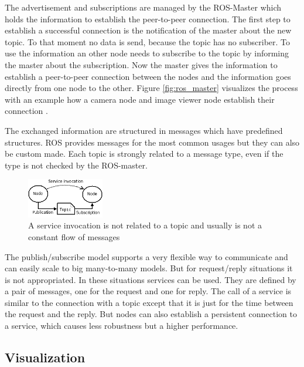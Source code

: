 The advertisement and subscriptions are managed by the ROS-Master which holds the information to establish the peer-to-peer connection.
The first step to establish a successful connection is the notification of the master about the new topic.
To that moment no data is send, because the topic has no subscriber.
To use the information an other node needs to subscribe to the topic by informing the master about the subscription.
Now the master gives the information to establish a peer-to-peer connection between the nodes and the information goes directly from one node to the other.
Figure \ref{fig:ros_master} visualizes the process with an example how a camera node and image viewer node establish their connection \cite{rosMaster}.

The exchanged information are structured in messages which have predefined structures.
ROS provides messages for the most common usages but they can also be custom made.
Each topic is strongly related to a message type, even if the type is not checked by the ROS-master.

\begin{figure}
    \centering
    \includegraphics[width=0.3\textwidth]{img/ros_master/service.png}

    \caption{A service invocation is not related to a topic and usually is not a constant flow of messages}
    \label{fig:service_invocation}
\end{figure}

The publish/subscribe model supports a very flexible way to communicate and can easily scale to big many-to-many models.
But for request/reply situations it is not appropriated.
In these situations services can be used.
They are defined by a pair of messages, one for the request and one for reply.
The call of a service is similar to the connection with a topic except that it is just for the time between the request and the reply.
But nodes can also establish a persistent connection to a service, which causes less robustness but a higher performance.

\subsection{Visualization}\label{ssec:visualization}

